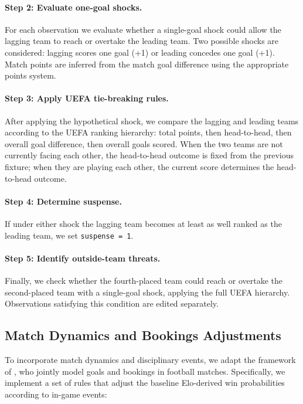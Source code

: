\documentclass[11pt]{article}
\begin{document}
\paragraph{Step 2: Evaluate one-goal shocks.}
For each observation we evaluate whether a single-goal shock could allow the lagging team to reach or overtake the leading team. Two possible shocks are considered: lagging scores one goal (+1) or leading concedes one goal (+1). Match points are inferred from the match goal difference using the appropriate points system.

\paragraph{Step 3: Apply UEFA tie-breaking rules.}
After applying the hypothetical shock, we compare the lagging and leading teams according to the UEFA ranking hierarchy: total points, then head-to-head, then overall goal difference, then overall goals scored. When the two teams are not currently facing each other, the head-to-head outcome is fixed from the previous fixture; when they are playing each other, the current score determines the head-to-head outcome.

\paragraph{Step 4: Determine suspense.}
If under either shock the lagging team becomes at least as well ranked as the leading team, we set \texttt{suspense = 1}.

\paragraph{Step 5: Identify outside-team threats.}
Finally, we check whether the fourth-placed team could reach or overtake the second-placed team with a single-goal shock, applying the full UEFA hierarchy. Observations satisfying this condition are edited separately.


\subsection{Match Dynamics and Bookings Adjustments}
\label{sec:bookings}

To incorporate match dynamics and disciplinary events, we adapt the framework of \citet{titman2015joint}, who jointly model goals and bookings in football matches. Specifically, we implement a set of rules that adjust the baseline Elo-derived win probabilities according to in-game events:
\end{document}
